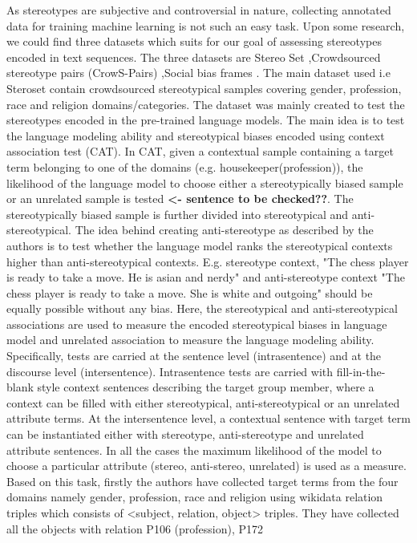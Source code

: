 As stereotypes are subjective and controversial in nature, collecting annotated data for training machine learning is not such an easy task. Upon some research, we could find three datasets which suits for our goal of assessing stereotypes encoded in text sequences. The three datasets are Stereo Set \cite{nadeem2020stereoset},Crowdsourced stereotype pairs (CrowS-Pairs) \cite{nangia2020crows},Social bias frames \cite{sap2019social}. The main dataset used i.e Steroset \cite{nadeem2020stereoset} contain crowdsourced stereotypical samples covering gender, profession, race and religion domains/categories. The dataset was mainly created to test the stereotypes encoded in the pre-trained language models. The main idea is to test the language modeling ability and stereotypical biases encoded using context association test (CAT). In CAT, given a contextual sample containing a target term belonging to one of the domains (e.g. housekeeper(profession)), the likelihood of the language model to choose either a stereotypically biased sample or an unrelated sample is tested \textbf{<- sentence to be checked??}. The stereotypically biased sample is further divided into stereotypical and anti-stereotypical. The idea behind creating anti-stereotype as described by the authors is to test whether the language model ranks the stereotypical contexts higher than anti-stereotypical contexts. E.g. stereotype context, "The chess player is ready to take a move. He is asian and nerdy" and anti-stereotype context "The chess player is ready to take a move. She is white and outgoing" should be equally possible without any bias. Here, the stereotypical and anti-stereotypical associations are used to measure the encoded stereotypical biases in language model and unrelated association to measure the language modeling ability. Specifically, tests are carried at the sentence level (intrasentence) and at the discourse level (intersentence). Intrasentence tests are carried with fill-in-the-blank style context sentences describing the target group member, where a context can be filled with either stereotypical, anti-stereotypical or an unrelated attribute terms. At the intersentence level, a contextual sentence with target term can be instantiated either with stereotype, anti-stereotype and unrelated attribute sentences. In all the cases the maximum likelihood of the model to choose a particular attribute (stereo, anti-stereo, unrelated) is used as a measure. Based on this task, firstly the authors have collected target terms from the four domains namely gender, profession, race and religion using wikidata relation triples \cite{vrandevcic2014wikidata} which consists of <subject, relation, object> triples. They have collected all the objects with relation P106 (profession), P172
